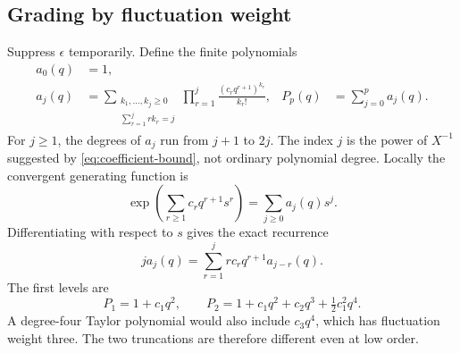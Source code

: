 \subsection{Grading by fluctuation weight}
Suppress \(\epsilon\) temporarily. Define the finite polynomials
\begin{subequations}\label{eq:partition}
\begin{align}
 a_0(q)&=1,\\
 a_j(q)&=\sum_{\substack{k_1,\ldots,k_j\ge0\\\sum_{r=1}^j rk_r=j}}
           \prod_{r=1}^j\frac{(c_rq^{r+1})^{k_r}}{k_r!},
 &P_p(q)&=\sum_{j=0}^p a_j(q).
\end{align}
\end{subequations}
For \(j\ge1\), the degrees of \(a_j\) run from \(j+1\) to \(2j\).
The index \(j\) is the power of \(X^{-1}\) suggested by
\eqref{eq:coefficient-bound}, not ordinary polynomial degree.
Locally the convergent generating function is
\[
 \exp\left(\sum_{r\ge1}c_rq^{r+1}s^r\right)=\sum_{j\ge0}a_j(q)s^j.
\]
Differentiating with respect to \(s\) gives the exact recurrence
\begin{equation}
 j a_j(q)=\sum_{r=1}^j r c_rq^{r+1}a_{j-r}(q).
 \label{eq:initial-recurrence}
\end{equation}
The first levels are
\begin{equation}
 P_1=1+c_1q^2,\qquad
 P_2=1+c_1q^2+c_2q^3+\tfrac12c_1^2q^4.
 \label{eq:first-polynomials}
\end{equation}
A degree-four Taylor polynomial would also include \(c_3q^4\),
which has fluctuation weight three. The two truncations are
therefore different even at low order.

